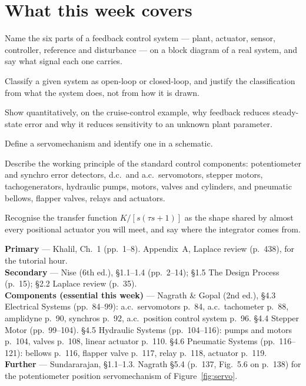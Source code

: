 \documentclass[11pt,a4paper]{article}
\begin{document}
\weektitle

\section*{What this week covers}

\begin{outcomes}
\item Name the six parts of a feedback control system --- plant, actuator,
      sensor, controller, reference and disturbance --- on a block diagram of a
      real system, and say what signal each one carries.
\item Classify a given system as open-loop or closed-loop, and justify the
      classification from what the system does, not from how it is drawn.
\item Show quantitatively, on the cruise-control example, why feedback reduces
      steady-state error and why it reduces sensitivity to an unknown plant
      parameter.
\item Define a servomechanism and identify one in a schematic.
\item Describe the working principle of the standard control components:
      potentiometer and synchro error detectors, d.c.\ and a.c.\ servomotors,
      stepper motors, tachogenerators, hydraulic pumps, motors, valves and
      cylinders, and pneumatic bellows, flapper valves, relays and actuators.
\item Recognise the transfer function $K/[s(\tau s+1)]$ as the shape shared by
      almost every positional actuator you will meet, and say where the
      integrator comes from.
\end{outcomes}

\begin{readingbox}
\textbf{Primary} --- Khalil, Ch.~1 (pp.~1--8). Appendix~A, Laplace review
(p.~438), for the tutorial hour.\\
\textbf{Secondary} --- Nise (6th ed.), \S1.1--1.4 (pp.~2--14); \S1.5 The Design
Process (p.~15); \S2.2 Laplace review (p.~35).\\
\textbf{Components (essential this week)} --- Nagrath \& Gopal (2nd ed.),
\S4.3 Electrical Systems (pp.~84--99): a.c.\ servomotors p.~84, a.c.\
tachometer p.~88, amplidyne p.~90, synchros p.~92, a.c.\ position control
system p.~96. \S4.4 Stepper Motor (pp.~99--104). \S4.5 Hydraulic Systems
(pp.~104--116): pumps and motors p.~104, valves p.~108, linear actuator
p.~110. \S4.6 Pneumatic Systems (pp.~116--121): bellows p.~116, flapper valve
p.~117, relay p.~118, actuator p.~119.\\
\textbf{Further} --- Sundararajan, \S1.1--1.3. Nagrath \S5.4 (p.~137, Fig.~5.6 on p.~138) for the
potentiometer position servomechanism of Figure~\ref{fig:servo}.
\end{readingbox}
\end{document}
